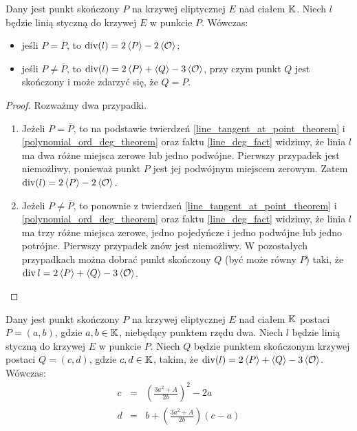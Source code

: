 \begin{theorem}
Dany jest punkt skończony $P$ na krzywej eliptycznej $E$ nad ciałem $\mathbb{K}$.
Niech $l$ będzie linią styczną do krzywej $E$ w punkcie $P$.
Wówczas:
\begin{itemize}
\item jeśli $P = \overline{P}$,
to $\operatorname{div}(l) = 2\left\langle P\right\rangle - 2\left\langle\mathcal{O}\right\rangle$;
\item jeśli $P \neq \overline{P}$,
to $\operatorname{div}(l) = 2\left\langle P\right\rangle + \left\langle Q\right\rangle - 3\left\langle\mathcal{O}\right\rangle$,
przy czym punkt $Q$ jest skończony
i może zdarzyć się, że $Q = P$.
\end{itemize}
\end{theorem}

\begin{proof}
Rozważmy dwa przypadki.
\begin{enumerate}
\item
Jeżeli $P = \overline{P}$,
to na podstawie twierdzeń
\ref{line_tangent_at_point_theorem} i \ref{polynomial_ord_deg_theorem}
oraz faktu \ref{line_deg_fact} widzimy,
że linia $l$ ma dwa różne miejsca zerowe lub jedno podwójne.
Pierwszy przypadek jest niemożliwy,
ponieważ punkt $P$ jest jej podwójnym miejscem zerowym.
Zatem $\operatorname{div}(l) = 2\left\langle P\right\rangle - 2\left\langle\mathcal{O}\right\rangle$.
\item
Jeżeli $P \neq \overline{P}$,
to ponownie z twierdzeń
\ref{line_tangent_at_point_theorem} i \ref{polynomial_ord_deg_theorem}
oraz faktu \ref{line_deg_fact} widzimy,
że linia $l$ ma trzy różne miejsca zerowe, jedno pojedyńcze i jedno podwójne
lub jedno potrójne.
Pierwszy przypadek znów jest niemożliwy.
W pozostałych przypadkach można dobrać punkt skończony $Q$
(być może równy $P$) taki,
że $\operatorname{div}{l} = 2\left\langle P\right\rangle + \left\langle Q\right\rangle - 3\left\langle\mathcal{O}\right\rangle$.
\end{enumerate}
\end{proof}

\begin{theorem}
Dany jest punkt skończony $P$ na krzywej eliptycznej $E$ nad ciałem $\mathbb{K}$
postaci $P = (a, b)$, gdzie $a, b \in \mathbb{K}$,
niebędący punktem rzędu dwa.
Niech $l$ będzie linią styczną do krzywej $E$ w punkcie $P$.
Niech $Q$ będzie punktem skończonym krzywej
postaci $Q = (c, d)$, gdzie $c, d \in \mathbb{K}$, takim,
że $\operatorname{div}(l) = 2\left\langle P\right\rangle + \left\langle Q\right\rangle - 3\left\langle\mathcal{O}\right\rangle$.
Wówczas:
\begin{eqnarray}
\label{tangent_line_third_point_x_eqn}
c & = & \left(\frac{3a^2 + A}{2b}\right)^2 - 2a \\
\label{tangent_line_third_point_y_eqn}
d & = & b + \left(\frac{3a^2 + A}{2b}\right)(c - a)
\end{eqnarray}
\end{theorem}

